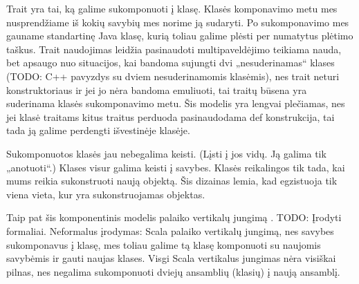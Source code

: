 Trait yra tai, ką galime sukomponuoti į klasę. Klasės komponavimo
metu mes nusprendžiame iš kokių savybių mes norime ją sudaryti.
Po sukomponavimo mes gauname standartinę Java klasę, kurią
toliau galime plėsti per numatytus plėtimo taškus. Trait naudojimas
leidžia pasinaudoti multipaveldėjimo teikiama nauda, bet apsaugo
nuo situacijos, kai bandoma sujungti dvi „nesuderinamas“ klases
(TODO: C++ pavyzdys su dviem nesuderinamomis klasėmis), nes
trait neturi konstruktoriaus ir jei jo nėra bandoma emuliuoti,
tai traitų būsena yra suderinama klasės sukomponavimo metu. Šis
modelis yra lengvai plečiamas, nes jei klasė traitams kitus traitus
perduoda pasinaudodama def konstrukcija, tai tada ją galime perdengti
išvestinėje klasėje.

Sukomponuotos klasės jau nebegalima keisti. (Lįsti į jos vidų. Ją galima
tik „anotuoti“.) Klases visur galima keisti į savybes. Klasės reikalingos
tik tada, kai mums reikia sukonstruoti naują objektą. Šis dizainas
lemia, kad egzistuoja tik viena vieta, kur yra sukonstruojamas objektas.

Taip pat šis komponentinis modelis palaiko vertikalų jungimą
\cite[598p.]{classification-framework-for-scm}.
TODO: Įrodyti formaliai. Neformalus įrodymas: Scala palaiko vertikalų
jungimą, nes savybes sukomponavus į klasę, mes toliau galime tą
klasę komponuoti su naujomis savybėmis ir gauti naujas klases.
Visgi Scala vertikalus jungimas nėra visiškai pilnas, nes negalima
sukomponuoti dviejų ansamblių (klasių) į naują ansamblį.
